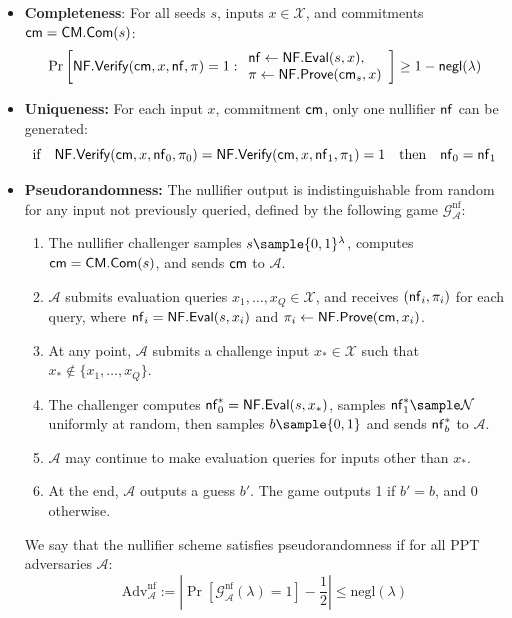 \begin{itemize}
    \item \textbf{Completeness}: For all seeds $s$, inputs $x \in \mathcal{X}$, and commitments $\mathsf{cm} = \mathsf{CM.Com}(s)$:
    \[
    \Pr\left[ \mathsf{NF.Verify}(\mathsf{cm}, x, \mathsf{nf}, \pi) = 1 :  
    \begin{array}{l}
    \mathsf{nf} \gets \mathsf{NF.Eval}(s,x), \\
    \pi \gets \mathsf{NF.Prove}(\mathsf{cm}_s, x)
    \end{array}
    \right] \geq 1-\mathsf{negl}(\lambda)
    \]

    \item \textbf{Uniqueness:} For each input $x$, commitment $\mathsf{cm}$, only one nullifier $\mathsf{nf}$ can be generated:
    \[
    \text{if} \quad \mathsf{NF.Verify}(\mathsf{cm}, x, \mathsf{nf}_0, \pi_0) = \mathsf{NF.Verify}(\mathsf{cm}, x, \mathsf{nf}_1, \pi_1) = 1 \quad \text{then} \quad \mathsf{nf}_0 = \mathsf{nf}_1
    \]

    \item \textbf{Pseudorandomness:} The nullifier output is indistinguishable from random for any input not previously queried, defined by the following game $\mathcal{G}_{\mathcal{A}}^{\text{nf}}$:
    \begin{enumerate}
        \item The nullifier challenger samples $s \sample \{0,1\}^\lambda$, computes $\mathsf{cm} = \mathsf{CM.Com}(s)$, and sends $\mathsf{cm}$ to $\mathcal{A}$.
        \item $\mathcal{A}$ submits evaluation queries $x_1, \ldots, x_Q \in \mathcal{X}$, and receives $(\mathsf{nf}_i, \pi_i)$ for each query, where $\mathsf{nf}_i = \mathsf{NF.Eval}(s, x_i)$ and $\pi_i \leftarrow \mathsf{NF.Prove}(\mathsf{cm}, x_i)$.
        \item At any point, $\mathcal{A}$ submits a challenge input $x_* \in \mathcal{X}$ such that $x_* \not\in \{x_1, \ldots, x_Q\}$.
        \item The challenger computes $\mathsf{nf}_0^* = \mathsf{NF.Eval}(s, x_*)$, samples $\nf_1^* \sample \mathcal{N}$ uniformly at random, then samples $b \sample \{0,1\}$ and sends $\mathsf{nf}_b^*$ to $\mathcal{A}$.
        \item $\mathcal{A}$ may continue to make evaluation queries for inputs other than $x_*$.
        \item At the end, $\mathcal{A}$ outputs a guess $b'$. The game outputs 1 if $b' = b$, and 0 otherwise.
    \end{enumerate}
    
    We say that the nullifier scheme satisfies pseudorandomness if for all PPT adversaries $\mathcal{A}$:
    \[
    \text{Adv}_{\mathcal{A}}^{\text{nf}} := \left|\Pr\left[\mathcal{G}_{\mathcal{A}}^{\text{nf}}(\lambda) = 1\right] - \frac{1}{2}\right| \leq \text{negl}(\lambda)
    \]
    
\end{itemize}







